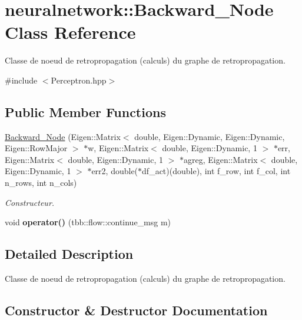 \hypertarget{classneuralnetwork_1_1_backward___node}{}\section{neuralnetwork\+:\+:Backward\+\_\+\+Node Class Reference}
\label{classneuralnetwork_1_1_backward___node}


Classe de noeud de retropropagation (calculs) du graphe de retropropagation.  




{\ttfamily \#include $<$Perceptron.\+hpp$>$}

\subsection*{Public Member Functions}
\begin{DoxyCompactItemize}
\item 
\mbox{\hyperlink{classneuralnetwork_1_1_backward___node_ac50fc4da5912e0fd15b1d8fffda22b97}{Backward\+\_\+\+Node}} (Eigen\+::\+Matrix$<$ double, Eigen\+::\+Dynamic, Eigen\+::\+Dynamic, Eigen\+::\+Row\+Major $>$ $\ast$w, Eigen\+::\+Matrix$<$ double, Eigen\+::\+Dynamic, 1 $>$ $\ast$err, Eigen\+::\+Matrix$<$ double, Eigen\+::\+Dynamic, 1 $>$ $\ast$agreg, Eigen\+::\+Matrix$<$ double, Eigen\+::\+Dynamic, 1 $>$ $\ast$err2, double($\ast$df\+\_\+act)(double), int f\+\_\+row, int f\+\_\+col, int n\+\_\+rows, int n\+\_\+cols)
\begin{DoxyCompactList}\small\item\em Constructeur. \end{DoxyCompactList}\item 
\mbox{\label{classneuralnetwork_1_1_backward___node_a1d4dde8273848724d43e3923e9482f5d}} 
void {\bfseries operator()} (tbb\+::flow\+::continue\+\_\+msg m)
\end{DoxyCompactItemize}


\subsection{Detailed Description}
Classe de noeud de retropropagation (calculs) du graphe de retropropagation. 

\subsection{Constructor \& Destructor Documentation}
\mbox{\label{classneuralnetwork_1_1_backward___node_ac50fc4da5912e0fd15b1d8fffda22b97}} 
